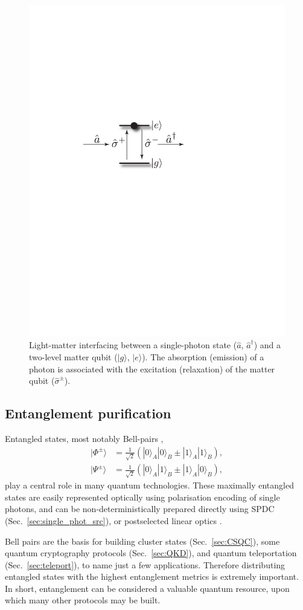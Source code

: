 \documentclass[aps,rmp,twocolumn,amsmath,amssymb,nofootinbib,superscriptaddress]{revtex4}
\newcommand{\ket}[1]{|#1\rangle}
\begin{document}
\begin{figure}[!htb]
\includegraphics[width=0.6\columnwidth]{opt_inter}
\caption{Light-matter interfacing between a single-photon state ($\hat{a}$, $\hat{a}^\dag$) and a two-level matter qubit ($\ket{g}$, $\ket{e}$). The absorption (emission) of a photon is associated with the excitation (relaxation) of the matter qubit ($\hat\sigma^\pm$).} \label{fig:opt_int}
\end{figure}

%
%

\subsection{Entanglement purification} \label{sec:ent_purif}

Entangled states, most notably Bell-pairs \cite{???},
\begin{align} \label{eq:bell_basis}
\ket{\Phi^{\pm}} &= \frac{1}{\sqrt{2}} (\ket{0}_A\ket{0}_B \pm \ket{1}_A\ket{1}_B), \nonumber \\
\ket{\Psi^{\pm}} &= \frac{1}{\sqrt{2}} (\ket{0}_A\ket{1}_B \pm \ket{1}_A\ket{0}_B),
\end{align}
play a central role in many quantum technologies. These maximally entangled states are easily represented optically using polarisation encoding of single photons, and can be non-deterministically prepared directly using SPDC (Sec.~\ref{sec:single_phot_src}), or postselected linear optics \cite{???}.

Bell pairs are the basis for building cluster states (Sec.~\ref{sec:CSQC}), some quantum cryptography protocols (Sec.~\ref{sec:QKD}), and quantum teleportation (Sec.~\ref{sec:teleport}), to name just a few applications. Therefore distributing entangled states with the highest entanglement metrics is extremely important. In short, entanglement can be considered a valuable quantum resource, upon which many other protocols may be built.
\end{document}
